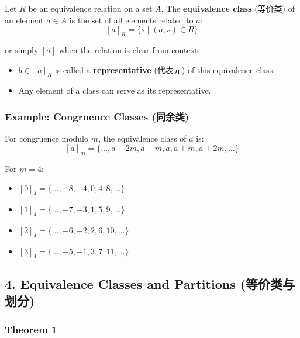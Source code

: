 \documentclass[10pt,a4paper,openany]{ctexbook}
\theoremstyle{definition}
\theoremstyle{remark}
\begin{document}
Let $R$ be an equivalence relation on a set $A$. The \textbf{equivalence class} (等价类) of an element $a \in A$ is the set of all elements related to $a$:
\[
[a]_R = \{s \mid (a,s) \in R\}
\]

or simply $[a]$ when the relation is clear from context.
\begin{itemize}
\item $b \in [a]_R$ is called a \textbf{representative} (代表元) of this equivalence class.
\item Any element of a class can serve as its representative.

\end{itemize}

\subsubsection{Example: Congruence Classes (同余类)}

For congruence modulo $m$, the equivalence class of $a$ is:
\[
[a]_m = \{\dots, a-2m, a-m, a, a+m, a+2m, \dots\}
\]

For $m = 4$:
\begin{itemize}
\item $[0]_4 = \{\dots, -8, -4, 0, 4, 8, \dots\}$
\item $[1]_4 = \{\dots, -7, -3, 1, 5, 9, \dots\}$
\item $[2]_4 = \{\dots, -6, -2, 2, 6, 10, \dots\}$
\item $[3]_4 = \{\dots, -5, -1, 3, 7, 11, \dots\}$

\end{itemize}

\vspace{-2pt}

\subsection{4. Equivalence Classes and Partitions (等价类与划分)}

\subsubsection{Theorem 1}
\end{document}
